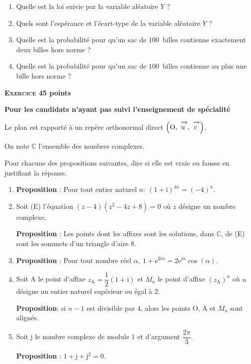 \documentclass[10pt]{article}
\newcommand{\C}{\mathbb{C}}
\newcommand{\vect}[1]{\mathchoice%
{\overrightarrow{\displaystyle\mathstrut#1\,\,}}%
{\overrightarrow{\textstyle\mathstrut#1\,\,}}%
{\overrightarrow{\scriptstyle\mathstrut#1\,\,}}%
{\overrightarrow{\scriptscriptstyle\mathstrut#1\,\,}}}
\def\Ouv{$\left(\text{O},~\vect{u},~\vect{v}\right)$}
\begin{document}
\medskip
 
\begin{enumerate}
\item Quelle est la loi suivie par la variable aléatoire $Y$ ? 
\item Quels sont l'espérance et l'écart-type de la variable aléatoire $Y$ ? 
\item Quelle est la probabilité pour qu'un sac de $100$~billes contienne exactement deux billes hors norme ? 
\item Quelle est la probabilité pour qu'un sac de $100$~billes contienne au plus une bille hors norme ? 
\end{enumerate}

\vspace{0,5cm}

\textbf{\textsc{Exercice 4}\hfill 5 points}

\textbf{Pour les candidats n'ayant pas suivi l'enseignement de spécialité}

\medskip
 
Le plan est rapporté à un repère orthonormal direct \Ouv.

On note $\C$ l'ensemble des nombres complexes.

\medskip
 
Pour chacune des propositions suivantes, dire si elle est vraie ou fausse en justifiant la réponse.

\bigskip
 
\begin{enumerate}
\item \textbf{Proposition} : Pour tout entier naturel $n :\: (1 + \text{i})^{4n} = (- 4)^n$. 
\item Soit (E) l'équation $(z - 4)\left(z^2 - 4z + 8\right) = 0$ où $z$ désigne un nombre complexe.
 
\textbf{Proposition} : Les points dont les affixes sont les solutions, dans $\C$, de (E) sont les sommets d'un triangle d'aire 8. 
\item \textbf{Proposition} : Pour tout nombre réel $\alpha,\: 1 + \text{e}^{2i\alpha} = 2\text{e}^{\text{i}\alpha} \cos(\alpha)$. 
\item Soit A le point d'affixe $z_{\text{A}} = \dfrac{1}{2}(1 + \text{i})$ et $M_{n}$ le point d'affixe $\left(z_{\text{A}}\right)^n$ où $n$ désigne un entier  naturel supérieur ou égal à $2$.
 
\textbf{Proposition}: si $n - 1$ est divisible par 4, alors les points O, A et $M_{n}$ sont alignés. 
\item Soit j le nombre complexe de module 1 et d'argument $\dfrac{2\pi}{3}$. 

\textbf{Proposition} : $1 + \text{j} + \text{j}^2 = 0$. 
\end{enumerate}
\end{document}
